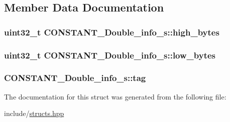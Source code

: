 \subsection{Member Data Documentation}
\hypertarget{structCONSTANT__Double__info__s_ac924312805777fa64c8f353464cc84fe}{
\subsubsection[{high\+\_\+bytes}]{\setlength{\rightskip}{0pt plus 5cm}uint32\+\_\+t C\+O\+N\+S\+T\+A\+N\+T\+\_\+\+Double\+\_\+info\+\_\+s\+::high\+\_\+bytes}}\label{structCONSTANT__Double__info__s_ac924312805777fa64c8f353464cc84fe}
\hypertarget{structCONSTANT__Double__info__s_ab4ea9f49f1751d71959cc7075c414cf3}{
\subsubsection[{low\+\_\+bytes}]{\setlength{\rightskip}{0pt plus 5cm}uint32\+\_\+t C\+O\+N\+S\+T\+A\+N\+T\+\_\+\+Double\+\_\+info\+\_\+s\+::low\+\_\+bytes}}\label{structCONSTANT__Double__info__s_ab4ea9f49f1751d71959cc7075c414cf3}
\hypertarget{structCONSTANT__Double__info__s_ac95905e32467bd7084ab69661f85dc83}{
\subsubsection[{tag}]{ C\+O\+N\+S\+T\+A\+N\+T\+\_\+\+Double\+\_\+info\+\_\+s\+::tag}}\label{structCONSTANT__Double__info__s_ac95905e32467bd7084ab69661f85dc83}


The documentation for this struct was generated from the following file\+:\begin{DoxyCompactItemize}
\item 
include/\hyperlink{structs_8hpp}{structs.\+hpp}\end{DoxyCompactItemize}
